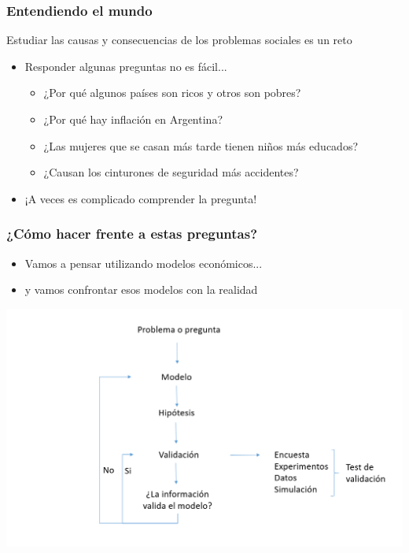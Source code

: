 \documentclass{beamer}
\begin{document}
\begin{frame}
\frametitle{Entendiendo el mundo}
Estudiar las causas y consecuencias de los problemas sociales es un reto 
\begin{itemize}
    \item Responder algunas preguntas no es fácil...
    \begin{itemize}
        \item ¿Por qué algunos países son ricos y otros son pobres?
        \item ¿Por qué hay inflación en Argentina?
        \item ¿Las mujeres que se casan más tarde tienen niños más educados?
        \item ¿Causan los cinturones de seguridad más accidentes?
        \end{itemize}
    \item ¡A veces es complicado comprender la pregunta!
\end{itemize}
\end{frame}

\begin{frame}
\frametitle{¿Cómo hacer frente a estas preguntas?}
    \begin{itemize}
            \item Vamos a pensar utilizando modelos económicos... \vspace{2mm}
            \item y vamos confrontar esos modelos con la realidad
    \end{itemize} \vspace{2mm}
\begin{center}
    \includegraphics[scale=0.4]{Slides Principios de Economia/C1.9.png}
\end{center}
\end{frame}
\end{document}
